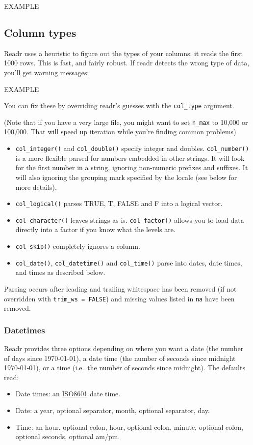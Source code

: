 EXAMPLE

\subsection{Column types}

Readr uses a heuristic to figure out the types of your columns: it reads
the first 1000 rows. This is fast, and fairly robust. If readr detects
the wrong type of data, you'll get warning messages:

EXAMPLE

You can fix these by overriding readr's guesses with the
\texttt{col\_type} argument.

(Note that if you have a very large file, you might want to set
\texttt{n\_max} to 10,000 or 100,000. That will speed up iteration while
you're finding common problems)

\begin{itemize}
\item
  \texttt{col\_integer()} and \texttt{col\_double()} specify integer and
  doubles. \texttt{col\_number()} is a more flexible parsed for numbers
  embedded in other strings. It will look for the first number in a
  string, ignoring non-numeric prefixes and suffixes. It will also
  ignoring the grouping mark specified by the locale (see below for more
  details).
\item
  \texttt{col\_logical()} parses TRUE, T, FALSE and F into a logical
  vector.
\item
  \texttt{col\_character()} leaves strings as is. \texttt{col\_factor()}
  allows you to load data directly into a factor if you know what the
  levels are.
\item
  \texttt{col\_skip()} completely ignores a column.
\item
  \texttt{col\_date()}, \texttt{col\_datetime()} and
  \texttt{col\_time()} parse into dates, date times, and times as
  described below.
\end{itemize}

Parsing occurs after leading and trailing whitespace has been removed
(if not overridden with \texttt{trim\_ws\ =\ FALSE}) and missing values
listed in \texttt{na} have been removed.

\subsubsection{Datetimes}

Readr provides three options depending on where you want a date (the
number of days since 1970-01-01), a date time (the number of seconds
since midnight 1970-01-01), or a time (i.e.~the number of seconds since
midnight). The defaults read:

\begin{itemize}
\itemsep1pt\parskip0pt
\item
  Date times: an \href{https://en.wikipedia.org/wiki/ISO_8601}{ISO8601}
  date time.
\item
  Date: a year, optional separator, month, optional separator, day.
\item
  Time: an hour, optional colon, hour, optional colon, minute, optional
  colon, optional seconds, optional am/pm.
\end{itemize}
